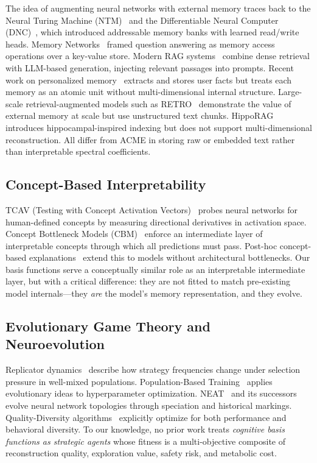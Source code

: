 \documentclass[review]{elsarticle}
\begin{document}
The idea of augmenting neural networks with external memory traces back to
the Neural Turing Machine (NTM)~\cite{graves2014neural} and the Differentiable
Neural Computer (DNC)~\cite{graves2016hybrid}, which introduced addressable
memory banks with learned read/write heads. Memory Networks~\cite{weston2014memory,
sukhbaatar2015end} framed question answering as memory access operations over
a key-value store. Modern RAG systems~\cite{lewis2020retrieval,karpukhin2020dense}
combine dense retrieval with LLM-based generation, injecting relevant passages
into prompts. Recent work on personalized memory~\cite{mem0,packer2023memgpt}
extracts and stores user facts but treats each memory as an atomic unit without
multi-dimensional internal structure. Large-scale retrieval-augmented models such
as RETRO~\cite{borgeaud2022retro} demonstrate the value of external memory at
scale but use unstructured text chunks. HippoRAG~\cite{gutierrez2024hipporag}
introduces hippocampal-inspired indexing but does not support multi-dimensional
reconstruction. All differ from ACME in storing raw or embedded text rather than
interpretable spectral coefficients.

\subsection{Concept-Based Interpretability}

TCAV (Testing with Concept Activation Vectors)~\cite{kim2018interpretability}
probes neural networks for human-defined concepts by measuring directional
derivatives in activation space. Concept Bottleneck Models
(CBM)~\cite{koh2020concept} enforce an intermediate layer of interpretable
concepts through which all predictions must pass. Post-hoc concept-based
explanations~\cite{yuksekgonul2022posthoc} extend this to models without
architectural bottlenecks. Our basis functions serve a conceptually similar
role as an interpretable intermediate layer, but with a critical difference:
they are not fitted to match pre-existing model internals---they \emph{are}
the model's memory representation, and they evolve.

\subsection{Evolutionary Game Theory and Neuroevolution}

Replicator dynamics~\cite{taylor1978evolutionary,hofbauer1998evolutionary}
describe how strategy frequencies change under selection pressure in
well-mixed populations. Population-Based Training~\cite{jaderberg2017population}
applies evolutionary ideas to hyperparameter optimization. NEAT~\cite{stanley2002evolving}
and its successors evolve neural network topologies through speciation
and historical markings. Quality-Diversity algorithms~\cite{pugh2016quality}
explicitly optimize for both performance and behavioral diversity. To our
knowledge, no prior work treats \emph{cognitive basis functions as strategic
agents} whose fitness is a multi-objective composite of reconstruction
quality, exploration value, safety risk, and metabolic cost.
\end{document}
